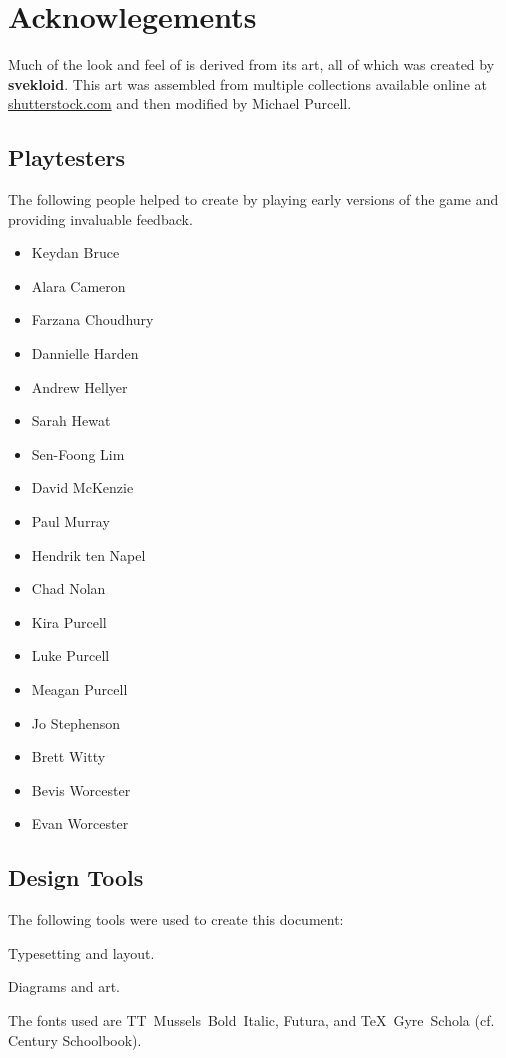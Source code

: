 \section*{Acknowlegements}
Much of the look and feel of \ENDEAVOUR{} is derived from its art, all of which was created by \textbf{svekloid}. This art was assembled from multiple collections available online at \href{http://shutterstock.com}{shutterstock.com} and then modified by Michael Purcell.  

\subsection*{Playtesters} \label{subsection:playtesters}
The following people helped to create \ENDEAVOUR{} by playing early versions of the game and providing invaluable feedback.\vspace{-1.75ex}
\begin{multicols}{2}
\begin{itemize}[noitemsep]
  \item Keydan Bruce
  \item Alara Cameron
  \item Farzana Choudhury
  \item Dannielle Harden
  \item Andrew Hellyer
  \item Sarah Hewat
  \item Sen-Foong Lim
  \item David McKenzie
  \item Paul Murray
  \item Hendrik ten Napel
  \item Chad Nolan
  \item Kira Purcell
  \item Luke Purcell
  \item Meagan Purcell
  \item Jo Stephenson
  \item Brett Witty
  \item Bevis Worcester
  \item Evan Worcester
\end{itemize}
\end{multicols}

\subsection*{Design Tools} \label{subsection:design-tools}
The following tools were used to create this document:
\begin{description}[font=\normalfont\textbullet\space, noitemsep, topsep=-1ex]
	\item[LuaLaTeX:] Typesetting and layout.
	\item[TikZ:] Diagrams and art.
\end{description}
\vspace{1ex}
The fonts used are {\setmainfont{TT Mussels-BoldItalic} TT~Mussels~Bold~Italic},  \textsf{Futura}, and TeX~Gyre~Schola (cf. Century Schoolbook).

